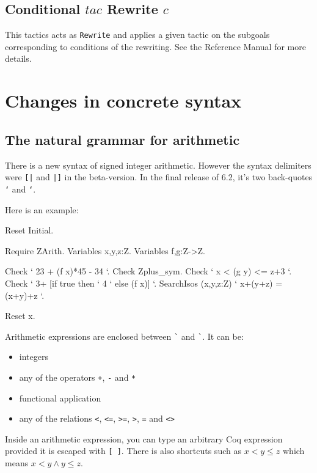 \documentclass[11pt]{article}
\begin{document}
\begin{coq_example*}
\subsection{Conditional $tac$ Rewrite $c$}
This tactics acts as \texttt{Rewrite} and applies a given tactic on the
subgoals corresponding to conditions of the rewriting.
See the Reference Manual for more details.


\section{Changes in concrete syntax}

\subsection{The natural grammar for arithmetic}
\label{zarith}
There is a  new syntax of signed integer arithmetic. However the
syntax delimiters were \verb=[|= and \verb=|]= in the beta-version. In
the final release of 6.2, it's two back-quotes \texttt{`} and \texttt{`}.

Here is an example: 
\begin{coq_eval}
Reset Initial. 
\end{coq_eval}

\begin{coq_example*}
Require ZArith.
Variables x,y,z:Z.
Variables f,g:Z->Z.
\end{coq_example*}
\begin{coq_example}
Check ` 23 + (f x)*45 - 34 `.
Check Zplus_sym.
Check ` x < (g y) <= z+3 `.
Check ` 3+ [if true then ` 4 ` else (f x)] `.
SearchIsos (x,y,z:Z) ` x+(y+z) = (x+y)+z `.
\end{coq_example}

\begin{coq_eval}
Reset x.
\end{coq_eval}

Arithmetic expressions are enclosed between \verb=`= and \verb=`=. It can
be:
\begin{itemize}
\item integers
\item any of the operators \verb|+|, \verb|-| and \verb|*|
\item functional application
\item any of the relations \verb|<|, \verb|<=|, \verb|>=|, \verb|>|,
\verb|=| and \verb|<>|
\end{itemize}

Inside an arithmetic expression, you can type an arbitrary Coq
expression provided it is escaped with \verb|[ ]|. There is also
shortcuts such as $x < y \le z$ which means $x<y \wedge y \le z$.


\end{coq_example*}
\end{document}
